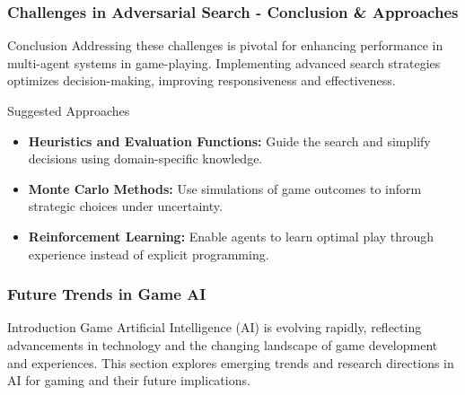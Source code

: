 \documentclass[aspectratio=169]{beamer}
\begin{document}
\begin{frame}[fragile]
    \frametitle{Challenges in Adversarial Search - Conclusion & Approaches}
    \begin{block}{Conclusion}
        Addressing these challenges is pivotal for enhancing performance in multi-agent systems in game-playing. Implementing advanced search strategies optimizes decision-making, improving responsiveness and effectiveness.
    \end{block}
    
    \begin{block}{Suggested Approaches}
        \begin{itemize}
            \item \textbf{Heuristics and Evaluation Functions:} Guide the search and simplify decisions using domain-specific knowledge.
            \item \textbf{Monte Carlo Methods:} Use simulations of game outcomes to inform strategic choices under uncertainty.
            \item \textbf{Reinforcement Learning:} Enable agents to learn optimal play through experience instead of explicit programming.
        \end{itemize}
    \end{block}
\end{frame}

\begin{frame}[fragile]
    \frametitle{Future Trends in Game AI}
    \begin{block}{Introduction}
        Game Artificial Intelligence (AI) is evolving rapidly, reflecting advancements in technology and the changing landscape of game development and experiences. This section explores emerging trends and research directions in AI for gaming and their future implications.
    \end{block}
\end{frame}
\end{document}

